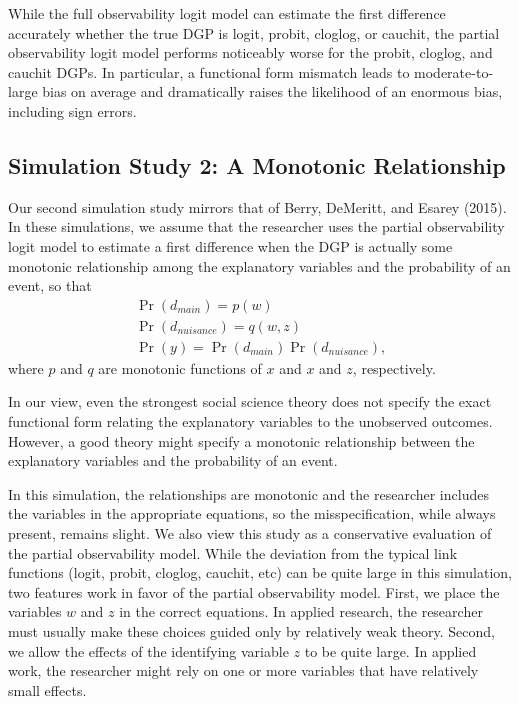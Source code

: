 \documentclass[10pt]{article}
\begin{document}
While the full observability logit model can estimate the first difference accurately whether the true DGP is logit, probit, cloglog, or cauchit, the partial observability logit model performs noticeably worse for the probit, cloglog, and cauchit DGPs. 
In particular, a functional form mismatch leads to moderate-to-large bias on average and dramatically raises the likelihood of an enormous bias, including sign errors.

\subsection*{Simulation Study 2: A Monotonic Relationship}

Our second simulation study mirrors that of Berry, DeMeritt, and Esarey (2015). 
In these simulations, we assume that the researcher uses the partial observability logit model to estimate a first difference when the DGP is actually some monotonic relationship among the explanatory variables and the probability of an event, so that 
\begin{gather*}
\Pr(d_{main}) = p(w)\nonumber\\
\Pr(d_{nuisance}) = q(w, z) \nonumber\\
\Pr(y) = \Pr(d_{main})\Pr(d_{nuisance})\text{,}\nonumber
\end{gather*}
where $p$ and $q$ are monotonic functions of $x$ and $x$ and $z$, respectively.

In our view, even the strongest social science theory does not specify the exact functional form relating the explanatory variables to the unobserved outcomes. 
However, a good theory might specify a monotonic relationship between the explanatory variables and the probability of an event.

In this simulation, the relationships are monotonic and the researcher includes the variables in the appropriate equations, so the misspecification, while always present, remains slight. 
We also view this study as a conservative evaluation of the partial observability model.
While the deviation from the typical link functions (logit, probit, cloglog, cauchit, etc) can be quite large in this simulation, two features work in favor of the partial observability model. 
First, we place the variables $w$ and $z$ in the correct equations. 
In applied research, the researcher must usually make these choices guided only by relatively weak theory.
Second, we allow the effects of the identifying variable $z$ to be quite large.
In applied work, the researcher might rely on one or more variables that have relatively small effects.
 
\end{document}
